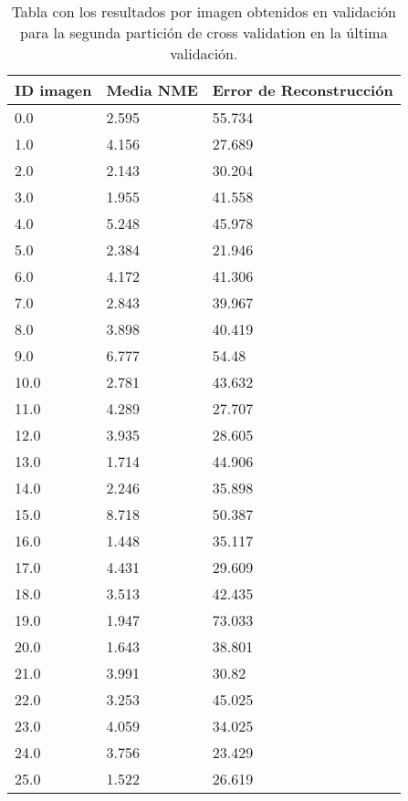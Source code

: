 \begin{table}[!ht]
    \centering
    \caption{Tabla con los resultados por imagen obtenidos en validación para la segunda partición de cross validation en la última validación.}
    \begin{tabular}{|l|l|l|}
    \hline
        ID imagen & Media NME & Error de Reconstrucción \\ \hline
        0.0 & 2.595 & 55.734 \\ \hline
        1.0 & 4.156 & 27.689 \\ \hline
        2.0 & 2.143 & 30.204 \\ \hline
        3.0 & 1.955 & 41.558 \\ \hline
        4.0 & 5.248 & 45.978 \\ \hline
        5.0 & 2.384 & 21.946 \\ \hline
        6.0 & 4.172 & 41.306 \\ \hline
        7.0 & 2.843 & 39.967 \\ \hline
        8.0 & 3.898 & 40.419 \\ \hline
        9.0 & 6.777 & 54.48 \\ \hline
        10.0 & 2.781 & 43.632 \\ \hline
        11.0 & 4.289 & 27.707 \\ \hline
        12.0 & 3.935 & 28.605 \\ \hline
        13.0 & 1.714 & 44.906 \\ \hline
        14.0 & 2.246 & 35.898 \\ \hline
        15.0 & 8.718 & 50.387 \\ \hline
        16.0 & 1.448 & 35.117 \\ \hline
        17.0 & 4.431 & 29.609 \\ \hline
        18.0 & 3.513 & 42.435 \\ \hline
        19.0 & 1.947 & 73.033 \\ \hline
        20.0 & 1.643 & 38.801 \\ \hline
        21.0 & 3.991 & 30.82 \\ \hline
        22.0 & 3.253 & 45.025 \\ \hline
        23.0 & 4.059 & 34.025 \\ \hline
        24.0 & 3.756 & 23.429 \\ \hline
        25.0 & 1.522 & 26.619 \\ \hline
    \end{tabular}
    \label{table::ModelBase_Partition4}
\end{table}

